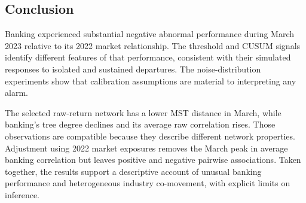 \documentclass[11pt,a4paper]{article}
\begin{document}
\subsection*{Conclusion}
Banking experienced substantial negative abnormal performance during March 2023 relative to its 2022 market relationship. The threshold and CUSUM signals identify different features of that performance, consistent with their simulated responses to isolated and sustained departures. The noise-distribution experiments show that calibration assumptions are material to interpreting any alarm.

The selected raw-return network has a lower MST distance in March, while banking's tree degree declines and its average raw correlation rises. Those observations are compatible because they describe different network properties. Adjustment using 2022 market exposures removes the March peak in average banking correlation but leaves positive and negative pairwise associations. Taken together, the results support a descriptive account of unusual banking performance and heterogeneous industry co-movement, with explicit limits on inference.

\clearpage
\setcounter{table}{0}
\end{document}
